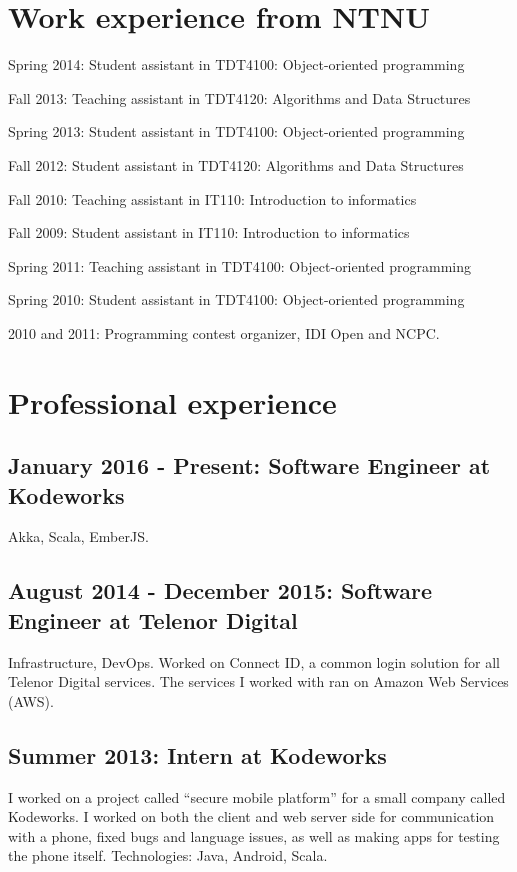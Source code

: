 \documentclass[letterpaper]{article}
\renewenvironment{itemize}{
  \begin{list}{}{
    \setlength{\leftmargin}{1.5em}
  }
}{
  \end{list}
}
\begin{document}
\section*{Work experience from NTNU}
\begin{itemize}
\item Spring 2014: Student assistant in TDT4100: Object-oriented programming
\item Fall 2013: Teaching assistant in TDT4120: Algorithms and Data
  Structures
\item Spring 2013: Student assistant in TDT4100: Object-oriented programming
\item Fall 2012: Student assistant in TDT4120: Algorithms and Data Structures

\item Fall 2010: Teaching assistant in IT110: Introduction to informatics
\item Fall 2009: Student assistant in  IT110: Introduction to informatics

\item Spring 2011: Teaching assistant in  TDT4100: Object-oriented programming
\item Spring 2010: Student assistant in  TDT4100: Object-oriented programming

\item 2010 and 2011: Programming contest organizer, IDI Open and NCPC.
\end{itemize}

\section*{Professional experience}
\subsection*{January 2016 - Present: Software Engineer at Kodeworks}
Akka, Scala, EmberJS.

\subsection*{August 2014 - December 2015: Software Engineer at Telenor Digital}
Infrastructure, DevOps. Worked on Connect ID, a common login solution for all Telenor Digital services.
The services I worked with ran on Amazon Web Services (AWS).

\subsection*{Summer 2013: Intern at Kodeworks}
I worked on a project called ``secure mobile platform'' for a small company
called Kodeworks. I worked on both the client and web
server side for communication with a phone, fixed bugs and language
issues, as well as making apps for testing the phone itself. Technologies: Java, Android, Scala.
\end{document}
